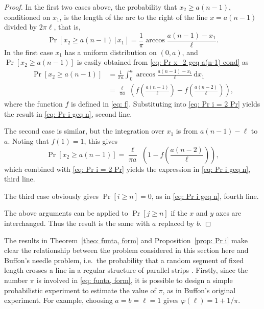 \documentclass[12pt, a4paper]{article}
\newcommand{\cond}{\,|\,} %
\newcommand{\diff}{\,\mathrm d}
\newcommand{\funta}{\varphi} %
\newcommand{\len}{\ell} %
\begin{document}
\begin{proof}
In the first two cases above, the probability that $x_2 \geq a(n-1)$, conditioned on $x_1$, is the length of the arc to the right of the line $x=a(n-1)$ divided by $2\pi\len$, that is,
\begin{equation}
\label{eq: Pr x_2 geq a(n-1) cond}
\Pr[x_2 \geq a(n-1) \cond x_1] = \frac 1 \pi \arccos \frac{a(n-1)-x_1}{\len}.
\end{equation}
In the first case $x_1$ has a uniform distribution on $(0,a)$, and $\Pr[x_2 \geq a(n-1)]$ is easily obtained from \eqref{eq: Pr x_2 geq a(n-1) cond} as
\begin{equation}
\label{eq: Pr x_2 geq a(n-1), first case}
\begin{split}
\Pr[x_2 \geq a(n-1)] &= \frac 1 {\pi a} \int_0^a\arccos \frac{a(n-1)-x_1}{\len} \diff x_1 \\
&= \frac{\len}{\pi a}\,\, \left( f\left( \frac{a(n-1)}{\len} \right) - f\left( \frac{a(n-2)}{\len} \right) \right),
\end{split}
\end{equation}
where the function $f$ is defined in \eqref{eq: f}. Substituting into \eqref{eq: Pr i = 2 Pr} yields the result in \eqref{eq: Pr i geq n}, second line.

The second case is similar, but the integration over $x_1$ is from $a(n-1)-\len$ to $a$. Noting that $f(1)=1$, this gives
\begin{equation}
\label{eq: Pr x_2 geq a(n-1), second case}
\Pr[x_2 \geq a(n-1)] = \frac{\len}{\pi a}\,\, \left( 1 - f\left( \frac{a(n-2)}{\len} \right) \right),
\end{equation}
which combined with \eqref{eq: Pr i = 2 Pr} yields the expression in \eqref{eq: Pr i geq n}, third line.

The third case obviously gives $\Pr[i \geq n] = 0$, as in \eqref{eq: Pr i geq n}, fourth line.

The above arguments can be applied to $\Pr[j \geq n]$ if the $x$ and $y$ axes are interchanged. Thus the result is the same with $a$ replaced by $b$.
\end{proof}

The results in Theorem~\ref{theo: funta, form} and Proposition~\ref{prop: Pr i} make clear the relationship between the problem considered in this section here and Buffon's needle problem, i.e.~the probability that a random segment of fixed length crosses a line in a regular structure of parallel strips \cite[section 1.1]{Mathai99}. Firstly, since the number $\pi$ is involved in \eqref{eq: funta, form}, it is possible to design a simple probabilistic experiment to estimate the value of $\pi$, as in Buffon's original experiment. For example, choosing $a=b=\len=1$ gives $\funta(\len) = 1+1/\pi$.
\end{document}
